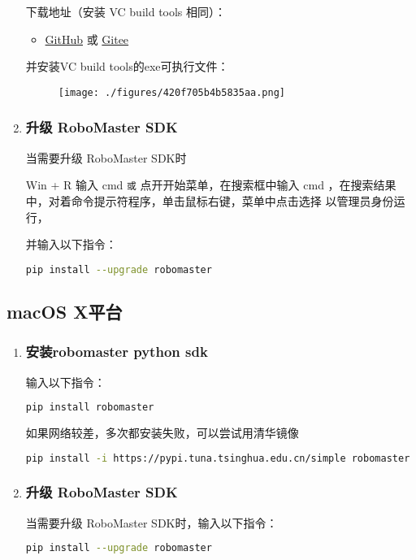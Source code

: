 \begin{enumerate}
下载地址（安装 VC build tools 相同）：\begin{itemize}
\item \href{https://github.com/dji-sdk/robomaster-sdk}{GitHub} 或 \href{https://gitee.com/xitinglin/RoboMaster-SDK}{Gitee}
\end{itemize}

并安装VC build tools的exe可执行文件：

\begin{figure}[ht]
\centering
\texttt{[image: ./figures/420f705b4b5835aa.png]}
\caption{} \label{fig_PyRM1_3}
\end{figure}

\item \subsubsection{升级 RoboMaster SDK}
当需要升级 RoboMaster SDK时

Win + R 输入 cmd 
\verb|或|
点开开始菜单，在搜索框中输入 cmd ，在搜索结果中，对着命令提示符程序，单击鼠标右键，菜单中点击选择 以管理员身份运行， 

并输入以下指令：

\begin{lstlisting}[language=bash]
pip install --upgrade robomaster
\end{lstlisting}

\end{enumerate}

\subsection{macOS X平台}\label{sub_PyRM1_2}
\begin{enumerate}
\item \subsubsection{安装robomaster python sdk}

输入以下指令：

\begin{lstlisting}[language=bash]
pip install robomaster
\end{lstlisting}

如果网络较差，多次都安装失败，可以尝试用清华镜像

\begin{lstlisting}[language=bash]
pip install -i https://pypi.tuna.tsinghua.edu.cn/simple robomaster
\end{lstlisting}

\item \subsubsection{升级 RoboMaster SDK}
当需要升级 RoboMaster SDK时，输入以下指令：

\begin{lstlisting}[language=bash]
pip install --upgrade robomaster
\end{lstlisting}

\end{enumerate}

